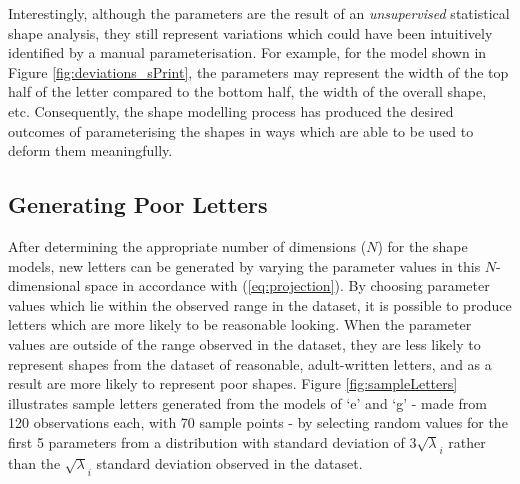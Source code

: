 \documentclass{sig-alternate}
\begin{document}
Interestingly, although the parameters are the result of an \emph{unsupervised}
statistical shape analysis, they still represent variations which could have
been intuitively identified by a manual parameterisation. For example, for the
model shown in Figure \ref{fig:deviations_sPrint}, the parameters may represent
the width of the top half of the letter compared to the bottom half, the width
of the overall shape, etc. Consequently, the shape modelling process has
produced the desired outcomes of parameterising the shapes in ways which are
able to be used to deform them meaningfully.


\subsection{Generating Poor Letters}

After determining the appropriate number of dimensions ($N$) for the shape
models, new letters can be generated by varying the parameter values in this
$N$-dimensional space in accordance with (\ref{eq:projection}). By choosing
parameter values which lie within the observed range in the dataset, it is
possible to produce letters which are more likely to be reasonable looking.
When the parameter values are outside of the range observed in the dataset, they
are less likely to represent shapes from the dataset of reasonable,
adult-written letters, and as a result are more likely to represent poor shapes.
Figure \ref{fig:sampleLetters} illustrates sample letters generated from the
models of `e' and `g' - made from 120 observations each, with 70 sample points -
by selecting random values for the first 5 parameters from a distribution with
standard deviation of $3\sqrt\lambda_i$ rather than the $\sqrt\lambda_i$
standard deviation observed in the dataset.
\end{document}
